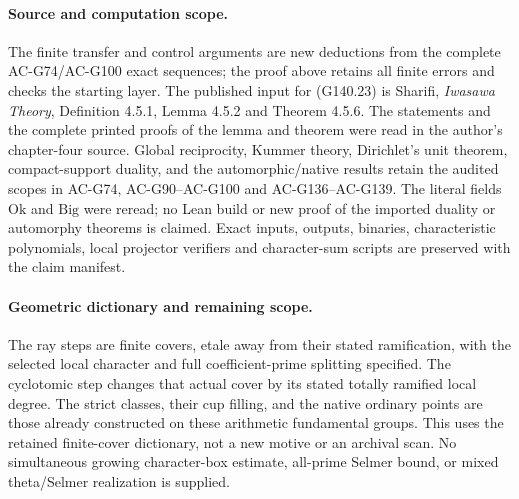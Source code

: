 \paragraph{Source and computation scope.}
The finite transfer and control arguments are new deductions
from the complete AC-G74/AC-G100 exact sequences; the proof
above retains all finite errors and checks the starting layer.
The published input for (G140.23) is Sharifi, \emph{Iwasawa
Theory}, Definition 4.5.1, Lemma 4.5.2 and Theorem 4.5.6.
The statements and the complete printed proofs of the lemma and
theorem were read in the author's chapter-four source.  Global reciprocity, Kummer theory,
Dirichlet's unit theorem, compact-support duality, and the
automorphic/native results retain the audited scopes in
AC-G74, AC-G90--AC-G100 and AC-G136--AC-G139.
The literal  fields
$\mathrm{Ok}$ and $\mathrm{Big}$ were reread; no Lean build
or new proof of the imported duality or automorphy theorems
is claimed.  Exact inputs, outputs, binaries, characteristic
polynomials, local projector verifiers and character-sum
scripts are preserved with the claim manifest.

\paragraph{Geometric dictionary and remaining scope.}
The ray steps are finite covers, etale away from their stated
ramification, with the selected local character and full
coefficient-prime splitting specified.  The cyclotomic step
changes that actual cover by its stated totally ramified local
degree.  The strict classes, their cup filling, and the native
ordinary points are those already constructed on these
arithmetic fundamental groups.  This uses the retained
finite-cover dictionary, not a new motive or an archival scan.
No simultaneous growing character-box estimate, all-prime
Selmer bound, or mixed theta/Selmer realization is supplied.
